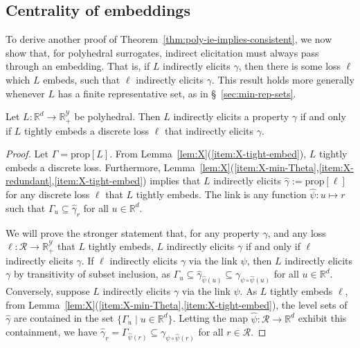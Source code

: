 \documentclass[twoside,11pt]{article}
\newcommand{\reals}{\mathbb{R}}
\newcommand{\prop}[1]{\mathrm{prop}[#1]}
\newcommand{\R}{\mathcal{R}}
\newcommand{\Y}{\mathcal{Y}}
\begin{document}
\subsection{Centrality of embeddings}

To derive another proof of Theorem~\ref{thm:poly-ie-implies-consistent}, we now show that, for polyhedral surrogates, indirect elicitation must always pass through an embedding.
That is, if $L$ indirectly elicits $\gamma$, then there is some loss $\ell$ which $L$ embeds, such that $\ell$ indirectly elicits $\gamma$.
This result holds more generally whenever $L$ has a finite representative set, as in \S~\ref{sec:min-rep-sets}.
\begin{lemma}\label{lem:ie-iff-embeds-refinement}
  Let $L:\reals^d\to\reals^\Y_+$ be polyhedral.
  Then $L$ indirectly elicits a property $\gamma$ if and only if $L$ tightly embeds a discrete loss $\ell$ that indirectly elicits $\gamma$.
\end{lemma}
\begin{proof}
  Let $\Gamma = \prop L$.
From Lemma~\ref{lem:X}(\ref{item:X-tight-embed}), $L$ tightly embeds a discrete loss.
  Furthermore, Lemma~\ref{lem:X}(\ref{item:X-min-Theta},\ref{item:X-redundant},\ref{item:X-tight-embed}) implies that $L$ indirectly elicits $\hat\gamma := \prop \ell$ for any discrete loss $\ell$ that $L$ tightly embeds.
  The link is any function $\hat\psi: u \mapsto r$ such that $\Gamma_u \subseteq \hat\gamma_r$ for all $u \in \reals^d$.

  We will prove the stronger statement that, for any property $\gamma$, and any loss $\ell:\R\to\reals^\Y_+$ that $L$ tightly embeds, $L$ indirectly elicits $\gamma$ if and only if $\ell$ indirectly elicits $\gamma$.
  If $\ell$ indirectly elicits $\gamma$ via the link $\psi$, then $L$ indirectly elicits $\gamma$ by transitivity of subset inclusion, as $\Gamma_u \subseteq \hat\gamma_{\hat\psi(u)} \subseteq \gamma_{\psi \circ \hat\psi(u)}$ for all $u \in \reals^d$.
  Conversely, suppose $L$ indirectly elicits $\gamma$ via the link $\psi$.
  As $L$ tightly embeds $\ell$, from Lemma~\ref{lem:X}(\ref{item:X-min-Theta},\ref{item:X-tight-embed}), the level sets of $\hat \gamma$ are contained in the set $\{\Gamma_u \mid u\in\reals^d\}$.
  Letting the map $\hat\psi:\R\to\reals^d$ exhibit this containment, we have $\hat\gamma_r = \Gamma_{\hat\psi(r)} \subseteq \gamma_{\psi \circ \hat\psi (r)}$ for all $r\in\R$.
\end{proof}
\end{document}
